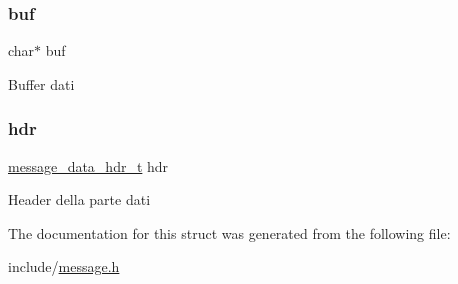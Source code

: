 \subsubsection{\texorpdfstring{buf}{buf}}
{\footnotesize\ttfamily char$\ast$ buf}

Buffer dati \mbox{\label{structmessage__data__t_ad76687ebed3a13ddae03410b64f3b134}} 
\subsubsection{\texorpdfstring{hdr}{hdr}}
{\footnotesize\ttfamily \hyperlink{structmessage__data__hdr__t}{message\+\_\+data\+\_\+hdr\+\_\+t} hdr}

Header della parte dati 

The documentation for this struct was generated from the following file\+:\begin{DoxyCompactItemize}
\item 
include/\hyperlink{message_8h}{message.\+h}\end{DoxyCompactItemize}
